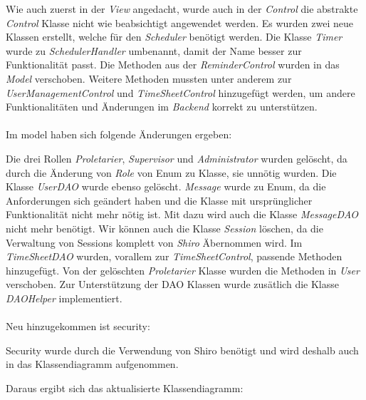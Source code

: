 Wie auch zuerst in der \emph{View} angedacht, wurde auch in der \emph{Control} die abstrakte \emph{Control} Klasse 
nicht wie beabsichtigt angewendet werden.
Es wurden zwei neue Klassen erstellt, welche für den \emph{Scheduler} benötigt werden. 
Die Klasse \emph{Timer} wurde zu \emph{SchedulerHandler} umbenannt, damit der Name besser zur Funktionalität passt.
Die Methoden aus der \emph{ReminderControl} wurden in das \emph{Model} verschoben.
Weitere Methoden mussten unter anderem zur \emph{UserManagementControl} und \emph{TimeSheetControl} hinzugefügt werden, 
um andere Funktionalitäten und Änderungen im \emph{Backend} korrekt zu unterstützen.\\
\\
Im model haben sich folgende Änderungen ergeben:

Die drei Rollen \emph{Proletarier}, \emph{Supervisor} und \emph{Administrator} wurden gelöscht, da durch 
die Änderung von \emph{Role} von Enum zu Klasse, sie unnötig wurden. Die Klasse \emph{UserDAO} wurde ebenso gelöscht.
\emph{Message} wurde zu Enum, da die Anforderungen sich geändert haben und 
die Klasse mit ursprünglicher Funktionalität nicht mehr nötig ist. Mit dazu wird auch die Klasse \emph{MessageDAO} nicht mehr benötigt.
Wir können auch die Klasse \emph{Session} löschen, da die Verwaltung von Sessions komplett von \emph{Shiro} Äbernommen wird.
Im \emph{TimeSheetDAO} wurden, vorallem zur \emph{TimeSheetControl}, passende Methoden hinzugefügt.
Von der gelöschten \emph{Proletarier} Klasse wurden die Methoden in \emph{User} verschoben.
Zur Unterstützung der DAO Klassen wurde zusätlich die Klasse \emph{DAOHelper} implementiert.\\
\\
Neu hinzugekommen ist security:

Security wurde durch die Verwendung von Shiro benötigt und wird deshalb auch in das Klassendiagramm aufgenommen.
\newpage

Daraus ergibt sich das aktualisierte Klassendiagramm:

